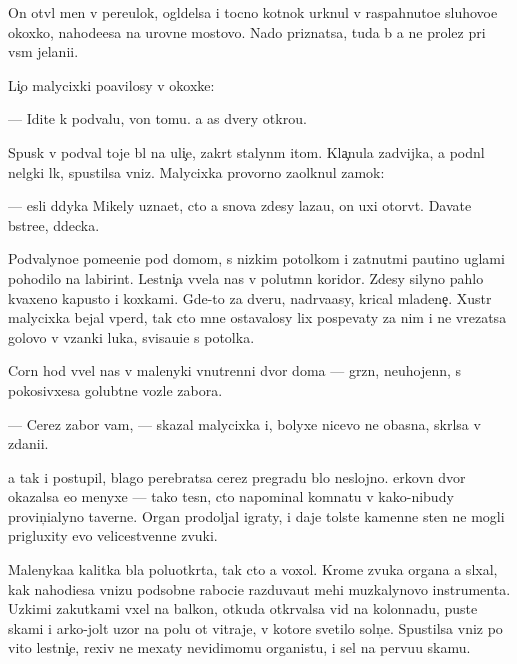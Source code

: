\documentclass[10pt]{book}
\begin{document}
On otv{\e}l men{\ia} v pereulok, ogl{\ia}delsa i tocno kot{\e}nok {\y}urknul v raspahnuto{\y}e sluhovo{\y}e okoxko, nahod{\ia}{\x}e{\y}esa na urovne mostovo{\y}. Nado priznatsa, tuda b{\yi} {\y}a ne prolez pri vs{\e}m jelani{\y}i.

Li{\c}o malycixki po{\y}avilosy v okoxke:

— Idite k podvalu, von tomu. {\Y}a {\x}as dvery otkro{\y}u.

Spusk v podval toje b{\yi}l na uli{\c}e, zakr{\yi}t{\yi}{\y} stalyn{\yi}m {\x}itom. Kla{\c}nula zadvijka, {\y}a podn{\ia}l nel{\e}gki{\y} l{\io}k, spustilsa vniz. Malycixka provorno za{\x}olknul zamok:

— {\Y}esli d{\ia}dyka Mikely uzna{\y}et, cto {\y}a snova zdesy laza{\y}u, on uxi otorv{\e}t. Dava{\y}te b{\yi}stre{\y}e, d{\ia}decka.

Podvalyno{\y}e po\-me\-{\x}e\-ni\-{\y}e pod domom, s nizkim potolkom i zat{\ia}nut{\yi}mi pautino{\y} uglami pohodilo na labirint. Lestni{\c}a v{\yi}vela nas v polut{\e}mn{\yi}{\y} koridor. Zdesy silyno pahlo kvaxeno{\y} kapusto{\y} i koxkami. Gde-to za dver{\y}u, nadr{\yi}va{\y}asy, krical mladene{\c}. Xustr{\yi}{\y} malycixka bejal vper{\e}d, tak cto mne ostavalosy lix pospevaty za nim i ne vrezatsa go\-lo\-vo{\y} v v{\ia}zanki luka, svisa{\y}u{\x}i{\y}e s potolka.

Corn{\yi}{\y} hod v{\yi}vel nas v ma\-leny\-ki{\y} vnutrenni{\y} dvor doma — gr{\ia}zn{\yi}{\y}, neuhojen\-n{\yi}{\y}, s pokosivxe{\y}sa golub{\ia}tne{\y} voz\-le zabora.

— Cerez zabor vam, — skazal malycixka i, bolyxe nicevo ne ob{\y}asn{\ia}{\y}a, skr{\yi}lsa v zdani{\y}i.

{\Y}a tak i postupil, blago perebratsa cerez pregradu b{\yi}lo neslojno. {\C}erkovn{\yi}{\y} dvor okazalsa {\y}e{\x}o menyxe — tako{\y} tesn{\yi}{\y}, cto napominal komnatu v kako{\y}-nibudy provin{\c}ialyno{\y} taverne. Organ prodoljal igraty, i daje tolst{\yi}{\y}e kamenn{\yi}{\y}e sten{\yi} ne mogli prigluxity {\y}evo velicestvenn{\yi}{\y}e zvuki.

Malenyka{\y}a kalitka b{\yi}la poluotkr{\yi}ta, tak cto {\y}a voxol. Krome zvuka organa {\y}a sl{\yi}xal, kak nahod{\ia}{\x}i{\y}esa vnizu podsobn{\yi}{\y}e raboci{\y}e razduva{\y}ut mehi muz{\yi}kaly\-no\-vo instrumenta. Uzkimi zakutkami v{\yi}xel na balkon, otkuda otkr{\yi}valsa vid na kolonnadu, pust{\yi}{\y}e skam{\y}i i {\y}arko-jolt{\yi}{\y} uzor na polu ot vitraje{\y}, v ko\-to\-r{\yi}\-{\y}e svetilo soln{\c}e. Spustilsa vniz po vito{\y} lestni{\c}e, rexiv ne mexaty nevidimomu organistu, i sel na pervu{\y}u skam{\y}u.
\end{document}
